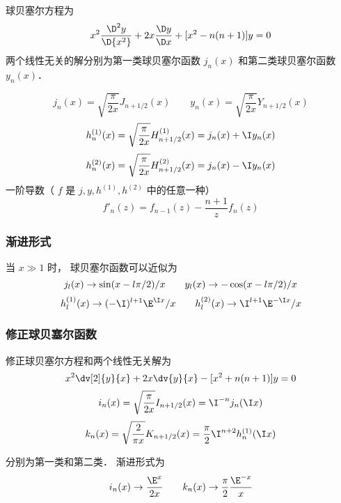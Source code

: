 

球贝塞尔方程为
 \begin{equation}
{x^2}\frac{{\D ^2}y}{\D {x^2}} + 2x\frac{\D y}{\D x} + [{x^2} - n(n + 1)]y = 0
\end{equation}
两个线性无关的解分别为第一类球贝塞尔函数 ${j_n}(x)$ 和第二类球贝塞尔函数 ${y_n}(x)$．  

 \begin{equation}
{j_n}(x) = \sqrt {\frac{\pi }{2x}} {J_{n + 1/2}}(x)
\qquad
{y_n}(x) = \sqrt {\frac{\pi }{2x}} {Y_{n + 1/2}}(x)
\end{equation}
 \begin{equation}
h_n^{(1)}(x) = \sqrt {\frac{\pi }{2x}} H_{n + 1/2}^{(1)}(x) = {j_n}(x) + \I y_n(x)
\end{equation}
 \begin{equation}
h_n^{(2)}(x) = \sqrt {\frac{\pi }{2x}} H_{n + 1/2}^{(2)}(x) = {j_n}(x) - \I y_n(x)
\end{equation}
一阶导数（ $f$ 是 $j,y,{h^{(1)}},{h^{(2)}}$ 中的任意一种）
\begin{equation}
{f'_n}(z) = {f_{n - 1}}(z) - \frac{n + 1}{z}{f_n}(z)
\end{equation}

\subsubsection{渐进形式}
当 $x \gg 1$ 时， 球贝塞尔函数可以近似为
 \begin{equation}
{j_l}(x) \to \sin (x - l\pi /2)/x
\qquad
{y_l}(x{\rm{)}} \to  - \cos (x - l\pi /2)/x
\end{equation}
 \begin{equation}
h_l^{(1)}(x) \to {( -\I)^{l + 1}}{\E^{\I x}}/x
\qquad
h_l^{(2)}(x) \to {\I^{l + 1}}{\E^{ - \I x}}/x
\end{equation}
    

\subsubsection{修正球贝塞尔函数}

修正球贝塞尔方程和两个线性无关解为
 \begin{equation}
 {x^2}\dv[2]{y}{x} + 2x\dv{y}{x} - [x^2 + n(n + 1)]y = 0
\end{equation}
 \begin{equation}
 {i_n}(x) = \sqrt {\frac{\pi }{2x}} {I_{n + 1/2}}(x) = {\I^{ - n}}{j_n}(\I x)
 \end{equation}
 \begin{equation}
{k_n}(x) = \sqrt {\frac{2}{\pi x}} {K_{n + 1/2}}(x) = \frac{\pi }{2}{\I^{n + 2}}h_n^{(1)}(\I x)
\end{equation}


分别为第一类和第二类． 渐进形式为
  \begin{equation}
{i_n}(x) \to \frac{\E^x}{2x}
\qquad
{k_n}(x) \to \frac{\pi }{2}\frac{\E^{ - x}}{x}
\end{equation}
